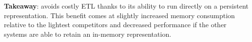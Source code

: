 \textbf{Takeaway}: \project{} avoids costly ETL thanks to its ability to run directly on a persistent representation.
This benefit comes at slightly increased memory consumption relative to the lightest competitors and decreased performance if the other systems are able to retain an in-memory representation.

